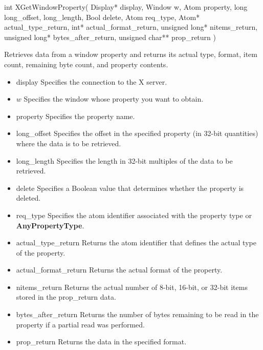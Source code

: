 \documentclass{report}
\begin{document}
\begin{itemize}
            \begin{cppcode}
            int XGetWindowProperty(
                Display* display,
                Window w,
                Atom property,
                long long_offset, long_length,
                Bool delete,
                Atom req_type,
                Atom* actual_type_return,
                int* actual_format_return,
                unsigned long* nitems_return,
                unsigned long* bytes_after_return,
                unsigned char** prop_return
            )
            \end{cppcode}
            \bigbreak \noindent
            Retrieves data from a window property and returns its actual type, format, item count, remaining byte count, and property contents.

            \begin{itemize}
                \item display Specifies the connection to the X server.
                \item $w$ Specifies the window whose property you want to obtain.
                \item property Specifies the property name.
                \item long\_offset Specifies the offset in the specified property (in 32-bit quantities) where the data is to be retrieved.
                \item long\_length Specifies the length in 32-bit multiples of the data to be retrieved.
                \item delete Specifies a Boolean value that determines whether the property is deleted.
                \item req\_type Specifies the atom identifier associated with the property type or \textbf{AnyPropertyType}.
                \item actual\_type\_return Returns the atom identifier that defines the actual type of the property.
                \item actual\_format\_return Returns the actual format of the property.
                \item nitems\_return Returns the actual number of 8-bit, 16-bit, or 32-bit items stored in the prop\_return data.
                \item bytes\_after\_return Returns the number of bytes remaining to be read in the property if a partial read was performed.
                \item prop\_return Returns the data in the specified format.
            \end{itemize}


\end{itemize}
\end{document}

